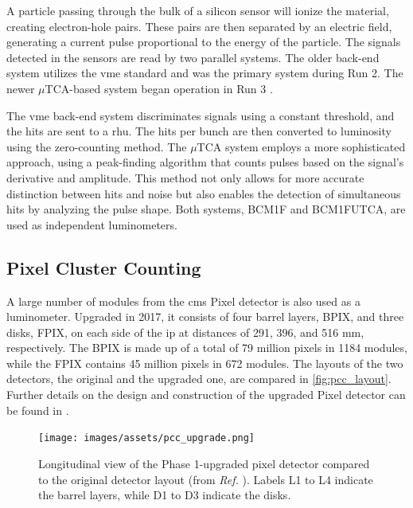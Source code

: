 
A particle passing through the bulk of a silicon sensor will ionize the material, creating electron-hole pairs. These pairs are then separated by an electric field, generating a current pulse proportional to the energy of the particle. The signals detected in the sensors are read by two parallel systems. The older back-end system utilizes the \acrfull{vme} standard and was the primary system during Run 2. The newer $\mu$TCA-based system began operation in Run 3 \cite{Karacheban:2294183}.

The \acrshort{vme} back-end system discriminates signals using a constant threshold, and the hits are sent to a \acrfull{rhu}. The hits per bunch are then converted to luminosity using the zero-counting method. The $\mu$TCA system employs a more sophisticated approach, using a peak-finding algorithm that counts pulses based on the signal's derivative and amplitude. This method not only allows for more accurate distinction between hits and noise but also enables the detection of simultaneous hits by analyzing the pulse shape. Both systems, BCM1F and BCM1FUTCA, are used as independent luminometers.

\subsection{Pixel Cluster Counting}

A large number of modules from the \acrshort{cms} Pixel detector is also used as a luminometer. Upgraded in 2017, it consists of four barrel layers, BPIX, and three disks, FPIX, on each side of the \acrshort{ip} at distances of 291, 396, and 516 mm, respectively. The BPIX is made up of a total of 79 million pixels in 1184 modules, while the FPIX contains 45 million pixels in 672 modules. The layouts of the two detectors, the original and the upgraded one, are compared in \autoref{fig:pcc_layout}. Further details on the design and construction of the upgraded Pixel detector can be found in \cite{tracker2020cms}.

\begin{figure}[h]
\centering
\texttt{[image: images/assets/pcc\_upgrade.png]}
\caption[Upgraded pixel detector]{Longitudinal view of the Phase 1-upgraded pixel detector compared to the original detector layout (from \textit{Ref.} \cite{tracker2020cms}). Labels L1 to L4 indicate the barrel layers, while D1 to D3 indicate the disks.}
\label{fig:pcc_layout}
\end{figure}

